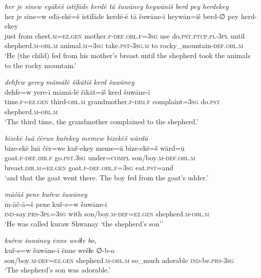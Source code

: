 \ea \label{KŠ.24}
\textit{her je sīnew eyākēš īstīfāde kerdē tā šuwāney heywāniš berd pey herdekey} \\ 
\gll her je sīne=w eđā-ekē=š īstīfāde kerdē-ē tā šuwāne-ī heywān=iš berd-∅ pey herd-ekey \\ 
 just from chest\textsc{.m}\textsc{=ez.gen} mother\textsc{.f}\textsc{-def}\textsc{.obl}\textsc{.f}\textsc{=3sg} use do\textsc{.pst}\textsc{.ptcp}\textsc{.pl}\textsc{-3pl} until shepherd\textsc{.m}\textsc{-obl}\textsc{.m} animal\textsc{.m}\textsc{=3sg} take\textsc{.pst}\textsc{-3sg}\textsc{.m} to rocky\_mountain\textsc{-def}\textsc{.obl}\textsc{.m} \\ 
\glt `He (the child) fed from his mother’s breast until the shepherd took the animals to the rocky mountain.'
\z 
 
\ea \label{KŠ.27}
\textit{dehfew yerey māmālē šikātiš kerd šuwāney} \\ 
\gll dehfe=w yere-ī māmā-lē šikāt=iš kerd šuwāne-ī \\ 
 time\textsc{.f}\textsc{=ez.gen} third\textsc{-obl}\textsc{.m} grandmother\textsc{.f}\textsc{-dim}\textsc{.f} complaint\textsc{=3sg} do\textsc{.pst} shepherd\textsc{.m}\textsc{-obl}\textsc{.m} \\ 
\glt `The third time, the grandmother complained to the shepherd.'
\z 
 
\ea \label{KŠ.31}
\textit{bizekē luā čērwe kuřekey memew bizekēš wārdū} \\ 
\gll bize-ekē luā čēr=we kuř-ekey meme=ū bize-ekē=š wārd=ū \\ 
 goat\textsc{.f}\textsc{-def}\textsc{.dir}\textsc{.f} go\textsc{.pst}\textsc{.3sg} under\textsc{=compl} son/boy\textsc{.m}\textsc{-def}\textsc{.obl}\textsc{.m} breast\textsc{.dir}\textsc{.m}\textsc{=ez.gen} goat\textsc{.f}\textsc{-def}\textsc{.obl}\textsc{.f}\textsc{=3sg} eat\textsc{.pst}=and \\ 
\glt `and that the goat went there. The boy fed from the goat’s udder.'
\z 
 
\ea \label{KŠ.33}
\textit{māčāš pene kuřew šuwāney} \\ 
\gll m-āč-ā=š pene kuř-e=w šuwāne-ī \\ 
 \textsc{ind-}say\textsc{.prs}\textsc{-3pl}\textsc{=3sg} with son/boy\textsc{.m}\textsc{-def}\textsc{=ez.gen} shepherd\textsc{.m}\textsc{-obl}\textsc{.m} \\ 
\glt `He was called kuraw Shwanay ‘the shepherd’s son’'
\z 
 
\ea \label{KŠ.34}
\textit{kuřew šuwāney ēnne wešɫe bo,} \\ 
\gll kuř-e=w šuwāne-ī ēnne wešɫe ∅-b-o \\ 
 son/boy\textsc{.m}\textsc{-def}\textsc{=ez.gen} shepherd\textsc{.m}\textsc{-obl}\textsc{.m} so\_much adorable \textsc{ind-}be\textsc{.prs}\textsc{-3sg} \\ 
\glt `The shepherd’s son was adorable.'
\z 
 

